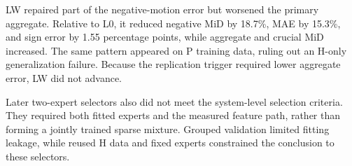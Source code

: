 

LW repaired part of the negative-motion error but worsened the primary aggregate. Relative to L0, it reduced negative MiD by 18.7\%, MAE by 15.3\%, and sign error by 1.55 percentage points, while aggregate and crucial MiD increased. The same pattern appeared on P training data, ruling out an H-only generalization failure. Because the replication trigger required lower aggregate error, LW did not advance.

Later two-expert selectors also did not meet the system-level selection criteria. They required both fitted experts and the measured feature path, rather than forming a jointly trained sparse mixture. Grouped validation limited fitting leakage, while reused H data and fixed experts constrained the conclusion to these selectors.
\FloatBarrier
